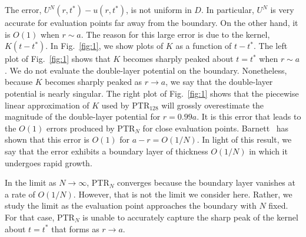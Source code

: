 \documentclass{article}[12pt]
\numberwithin{equation}{section}
\begin{document}
The error, $U^{N}(r,t^{\ast}) - u(r,t^{\ast})$, is not uniform in $D$.
In particular, $U^{N}$ is very accurate for evaluation points far away
from the boundary. On the other hand, it is $O(1)$ when $r \sim a$.
The reason for this large error is due to the kernel,
$K(t - t^{\ast})$.  In Fig.~\ref{fig:1}, we show plots of $K$ as a
function of $t - t^{\ast}$. The left plot of Fig.~\ref{fig:1} shows
that $K$ becomes sharply peaked about $t = t^{\ast}$ when $r \sim a$.
We do not evaluate the double-layer potential on the
boundary. Nonetheless, because $K$ becomes sharply peaked as
$r \to a$, we say that the double-layer potential is nearly singular.
%
%
  The right plot of Fig.~\ref{fig:1} shows that the piecewise linear
  approximation of $K$ used by PTR$_{128}$ will grossly overestimate
  the magnitude of the double-layer potential for $r = 0.99 a$.  It is
  this error that leads to the $O(1)$ errors produced by PTR$_{N}$ for
  close evaluation points.  Barnett~\cite{barnett2014evaluation} has
  shown that this error is $O(1)$ for $a - r = O(1/N)$. In light of
  this result, we say that the error exhibits a boundary layer of
  thickness $O(1/N)$ in which it undergoes rapid growth.
%

  In the limit as $N \to \infty$, PTR$_{N}$ converges because the
  boundary layer vanishes at a rate of $O(1/N)$. However, that is not
  the limit we consider here. Rather, we study the limit as the
  evaluation point approaches the boundary with $N$ fixed. For that
  case, PTR$_{N}$ is unable to accurately capture the sharp peak of
  the kernel about $t = t^{\ast}$ that forms as $r \to a$. 
\end{document}
